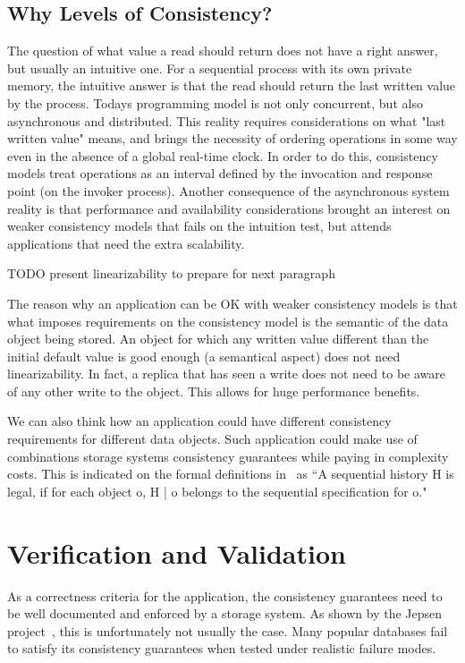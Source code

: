 \documentclass[12pt,conference]{IEEEtran}
\begin{document}
\subsection{Why Levels of Consistency?}

The question of what value a read should return does not have a right answer, but usually an intuitive one. For a sequential process with its own private memory, the intuitive answer is that the read should return the last written value by the process. Todays programming model is not only concurrent, but also asynchronous and distributed. This reality requires considerations on what "last written value" means, and brings the necessity of ordering operations in some way even in the absence of a global real-time clock. In order to do this, consistency models treat operations as an interval defined by the invocation and response point (on the invoker process). Another consequence of the asynchronous system reality is that performance and availability considerations brought an interest on weaker consistency models that fails on the intuition test, but attends applications that need the extra scalability.

TODO present linearizability to prepare for next paragraph

The reason why an application can be OK with weaker consistency models is that what imposes requirements on the consistency model is the semantic of the data object being stored. An object for which any written value different than the initial default value is good enough (a semantical aspect) does not need linearizability. In fact, a replica that has seen a write does not need to be aware of any other write to the object. This allows for huge performance benefits. 

We can also think how an application could have different consistency requirements for different data objects. Such application could make use of combinations storage systems consistency guarantees while paying in complexity costs. This is indicated on the formal definitions in~\cite{dziuma2013survey} as “A sequential history H is legal, if for each object o, H | o belongs to the sequential specification for o."

\section{Verification and Validation}

As a correctness criteria for the application, the consistency guarantees need to be well documented and enforced by a storage system. As shown by the Jepsen project~\cite{jepsenWebsite,jepsenGithubWebsite}, this is unfortunately not usually the case. Many popular databases fail to satisfy its consistency guarantees when tested under realistic failure modes.
\end{document}
